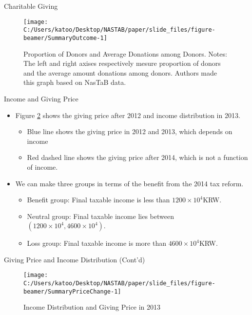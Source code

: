 \documentclass[
  ignorenonframetext,
  aspectratio=169,
]{beamer}
\providecommand{\tightlist}{%
  \setlength{\itemsep}{0pt}\setlength{\parskip}{0pt}}
\begin{document}
\begin{frame}{Charitable Giving}
\protect\hypertarget{charitable-giving}{}
\begin{figure}[t]

{\centering \texttt{[image: C:/Users/katoo/Desktop/NASTAB/paper/slide\_files/figure-beamer/SummaryOutcome-1]} 

}

\caption{Proportion of Donors and Average Donations among Donors. Notes: The left and right axises respectively mesure proportion of donors and the average amount donations among donors. Authors made this graph based on NasTaB data.}\label{fig:SummaryOutcome}
\end{figure}
\end{frame}

\begin{frame}{Income and Giving Price}
\protect\hypertarget{income-and-giving-price}{}
\begin{itemize}
\tightlist
\item
  Figure \ref{fig:SummaryPriceChange} shows the giving price after 2012 and income distribution in 2013.

  \begin{itemize}
  \tightlist
  \item
    Blue line shows the giving price in 2012 and 2013, which depends on income
  \item
    Red dashed line shows the giving price after 2014, which is not a function of income.
  \end{itemize}
\item
  We can make three groups in terms of the benefit from the 2014 tax reform.

  \begin{itemize}
  \tightlist
  \item
    Benefit group: Final taxable income is less than \(1200 \times 10^4\)KRW.
  \item
    Neutral group: Final taxable income lies between \((1200 \times 10^4, 4600 \times 10^4)\).
  \item
    Loss group: Final taxable income is more than \(4600 \times 10^4\)KRW.
  \end{itemize}
\end{itemize}
\end{frame}

\begin{frame}{Giving Price and Income Distribution (Cont'd)}
\protect\hypertarget{giving-price-and-income-distribution-contd}{}
\begin{figure}[t]

{\centering \texttt{[image: C:/Users/katoo/Desktop/NASTAB/paper/slide\_files/figure-beamer/SummaryPriceChange-1]} 

}

\caption{Income Distribution and Giving Price in 2013}\label{fig:SummaryPriceChange}
\end{figure}
\end{frame}
\end{document}
